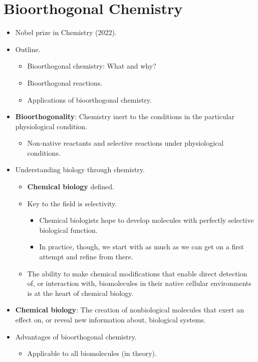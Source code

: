 \documentclass[../notes.tex]{subfiles}
\begin{document}
\section{Bioorthogonal Chemistry}
\begin{itemize}
    \item {}Nobel prize in Chemistry (2022).
    \item Outline.
    \begin{itemize}
        \item Bioorthogonal chemistry: What and why?
        \item Bioorthogonal reactions.
        \item Applications of bioorthogonal chemistry.
    \end{itemize}
    \item \textbf{Bioorthogonality}: Chemistry inert to the conditions in the particular physiological condition.
    \begin{itemize}
        \item Non-native reactants and selective reactions under physiological conditions.
    \end{itemize}
    \item Understanding biology through chemistry.
    \begin{itemize}
        \item \textbf{Chemical biology} defined.
        \item Key to the field is selectivity.
        \begin{itemize}
            \item Chemical biologists hope to develop molecules with perfectly selective biological function.
            \item In practice, though, we start with as much as we can get on a first attempt and refine from there.
        \end{itemize}
        \item The ability to make chemical modifications that enable direct detection of, or interaction with, biomolecules in their native cellular environments is at the heart of chemical biology.
    \end{itemize}
    \item \textbf{Chemical biology}: The creation of nonbiological molecules that exert an effect on, or reveal new information about, biological systems.
    \item Advantages of bioorthogonal chemistry.
    \begin{itemize}
        \item Applicable to all biomolecules (in theory).

\end{itemize}
\end{itemize}
\end{document}
